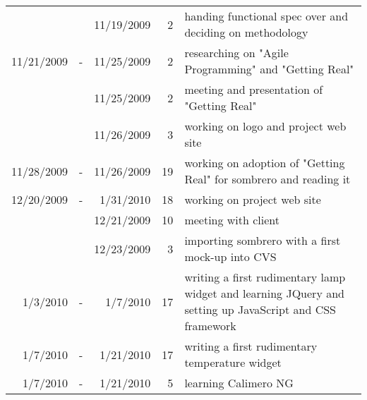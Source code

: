 \begin{tabular}{| r c r | r | p{9cm} |}
	&		&	11/19/2009	&	2	&	handing functional spec over and deciding on methodology \\
11/21/2009	&	-	&	11/25/2009	&	2	&	researching on "Agile Programming" and "Getting Real" \\
	&		&	11/25/2009	&	2	&	meeting and presentation of "Getting Real" \\
	&		&	11/26/2009	&	3	&	working on logo and project web site \\
11/28/2009	&	-	&	11/26/2009	&	19	&	working on adoption of "Getting Real" for sombrero and reading it \\
12/20/2009	&	-	&	1/31/2010	&	18	&	working on project web site \\
	&		&	12/21/2009	&	10	&	meeting with client \\
	&		&	12/23/2009	&	3	&	importing sombrero with a first mock-up into CVS \\
1/3/2010	&	-	&	1/7/2010	&	17	&	writing a first rudimentary lamp widget and learning JQuery and setting up JavaScript and CSS framework \\
1/7/2010	&	-	&	1/21/2010	&	17	&	writing a first rudimentary temperature widget \\
1/7/2010	&	-	&	1/21/2010	&	5	&	learning Calimero NG \\
\end{tabular}

